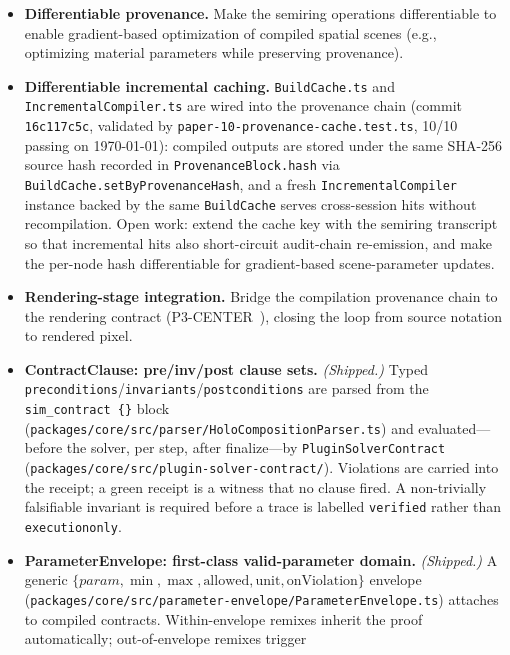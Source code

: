 \documentclass[sigconf,nonacm]{acmart}
\begin{document}
\begin{itemize}
  \item \textbf{Differentiable provenance.} Make the semiring
    operations differentiable to enable gradient-based
    optimization of compiled spatial scenes (e.g., optimizing
    material parameters while preserving provenance).
  \item \textbf{Differentiable incremental caching.}
    \texttt{BuildCache.ts} and \texttt{IncrementalCompiler.ts}
    are wired into the provenance chain (commit
    \texttt{16c117c5c}, validated by
    \texttt{paper-10-provenance-cache.test.ts}, 10/10 passing
    on \today): compiled outputs are stored under the same
    SHA-256 source hash recorded in
    \texttt{ProvenanceBlock.hash} via
    \texttt{BuildCache.setByProvenanceHash}, and a fresh
    \texttt{IncrementalCompiler} instance backed by the same
    \texttt{BuildCache} serves cross-session hits without
    recompilation.  Open work: extend the cache key with the
    semiring transcript so that incremental hits also
    short-circuit audit-chain re-emission, and make the
    per-node hash differentiable for gradient-based
    scene-parameter updates.
  \item \textbf{Rendering-stage integration.} Bridge the
    compilation provenance chain to the rendering contract
    (P3-CENTER~\cite{paper-13-dumbglass-siggraph2028}),
    closing the loop from source notation to rendered pixel.
  \item \textbf{ContractClause: pre/inv/post clause sets.} \emph{(Shipped.)}
    Typed \texttt{preconditions}/\texttt{invariants}/\texttt{postconditions}
    are parsed from the \texttt{sim\_contract~\{\}} block
    (\texttt{packages/core/src/parser/HoloCompositionParser.ts}) and
    evaluated—before the solver, per step, after finalize—by
    \texttt{PluginSolverContract} (\texttt{packages/core/src/plugin-solver-contract/}).
    Violations are carried into the receipt; a green receipt is a
    witness that no clause fired.  A non-trivially falsifiable invariant
    is required before a trace is labelled \texttt{verified}
    rather than \texttt{execution\-only}.
  \item \textbf{ParameterEnvelope: first-class valid-parameter domain.} \emph{(Shipped.)}
    A generic \(\{param,\min,\max,\text{allowed},\text{unit},\text{onViolation}\}\)
    envelope (\texttt{packages/core/src/parameter-envelope/ParameterEnvelope.ts})
    attaches to compiled contracts.  Within-envelope remixes inherit
    the proof automatically; out-of-envelope remixes trigger

\end{itemize}
\end{document}
